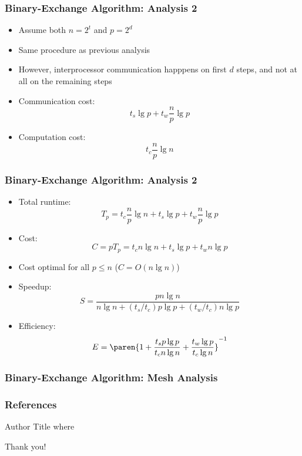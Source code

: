 \documentclass[xcolor=pdftex,dvipsnames,table]{presentation}
\begin{document}
\begin{frame}
	\frametitle{Binary-Exchange Algorithm: Analysis 2}

	\begin{itemize}
		\item Assume both $n=2^t$ and $p=2^d$
		\item Same procedure as previous analysis
		\item However, interprocessor communication happpens on first $d$ steps, and not at all on the remaining steps
		\item Communication cost:
		\[
			t_s\lg p+ t_w\frac{n}{p}\lg p
		\]
		\item Computation cost:
		\[
			t_c\frac{n}{p}\lg n
		\]
	\end{itemize}
\end{frame}

\begin{frame}
	\frametitle{Binary-Exchange Algorithm: Analysis 2}

	\begin{itemize}
		\item Total runtime:
		\[
			T_p = t_c\frac{n}{p}\lg n + t_s\lg p+ t_w\frac{n}{p}\lg p
		\]
		\item Cost:
		\[
			C=pT_p=t_c n\lg n +t_s \lg p +t_w n\lg p
		\]
		\item Cost optimal for all $p\leq n$ ($C=O(n\lg n)$)
		\item Speedup:
		\[
			S=\frac{pn\lg n}{n\lg n+(t_s/t_c)p\lg p+(t_w/t_c)n\lg p}
		\]
		\item Efficiency:
		\[
			E=\paren{1+\frac{t_sp\lg p}{t_c n\lg n}+\frac{t_w\lg p}{t_c\lg n}}^{-1}
		\]
	\end{itemize}
\end{frame}

\begin{frame}
	\frametitle{Binary-Exchange Algorithm: Mesh Analysis}

	
\end{frame}

\begin{frame}[allowframebreaks]
\frametitle{References}
	\begin{thebibliography}{10}
		Author
		\newblock{} Title
		\newblock{} where
	\end{thebibliography}
\end{frame}

\begin{frame}
\begin{Large}
\begin{center}
Thank you!
\end{center}
\end{Large}
\end{frame}
\end{document}
